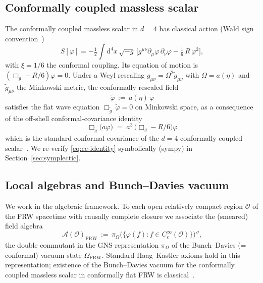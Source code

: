 \documentclass[11pt]{article}
\theoremstyle{definition}
\renewcommand{\AA}{\mathcal{A}}
\newcommand{\OO}{\mathcal{O}}
\newcommand{\FRW}{\mathrm{FRW}}
\begin{document}
\subsection{Conformally coupled massless scalar}\label{sec:cc}

The conformally coupled massless scalar in $d=4$ has classical action (Wald sign convention~\cite[\S4.6]{Wald1994})
\begin{equation}
\label{eq:S-cc}
S[\varphi] = -\tfrac{1}{2}\int \mathrm{d}^4 x\, \sqrt{-g}\,\Big[g^{\mu\nu}\partial_\mu\varphi\,\partial_\nu\varphi - \tfrac{1}{6}\,R\,\varphi^2\Big],
\end{equation}
with $\xi=1/6$ the conformal coupling. Its equation of motion is $(\Box_g - R/6)\varphi = 0$. Under a Weyl rescaling $g_{\mu\nu} = \Omega^2 \tilde g_{\mu\nu}$ with $\Omega=a(\eta)$ and $\tilde g_{\mu\nu}$ the Minkowski metric, the conformally rescaled field
\begin{equation}
\label{eq:rescale}
\tilde\varphi \,:=\, a(\eta)\,\varphi
\end{equation}
satisfies the flat wave equation $\Box_{\tilde g}\,\tilde\varphi = 0$ on Minkowski space, as a consequence of the off-shell conformal-covariance identity
\begin{equation}\label{eq:cc-identity}
\Box_{\tilde g}\big(a\varphi\big) \;=\; a^3\,\big(\Box_g - R/6\big)\varphi
\end{equation}
which is the standard conformal covariance of the $d=4$ conformally coupled scalar~\cite[\S4.6]{Wald1994}. We re-verify \eqref{eq:cc-identity} symbolically (sympy) in Section~\ref{sec:symplectic}.

\subsection{Local algebras and Bunch--Davies vacuum}\label{sec:algebras}

We work in the algebraic framework. To each open relatively compact region $\OO$ of the FRW spacetime with causally complete closure we associate the (smeared) field algebra
\begin{equation}
\label{eq:algebra}
\AA(\OO)_\FRW \,:=\, \pi_\Omega\big(\{\varphi(f) : f\in C_c^\infty(\OO)\}\big)'',
\end{equation}
the double commutant in the GNS representation $\pi_\Omega$ of the Bunch--Davies (= conformal) vacuum state $\Omega_\FRW$. Standard Haag--Kastler axioms hold in this representation; existence of the Bunch--Davies vacuum for the conformally coupled massless scalar in conformally flat FRW is classical~\cite[\S4.6]{Wald1994}.
\end{document}
